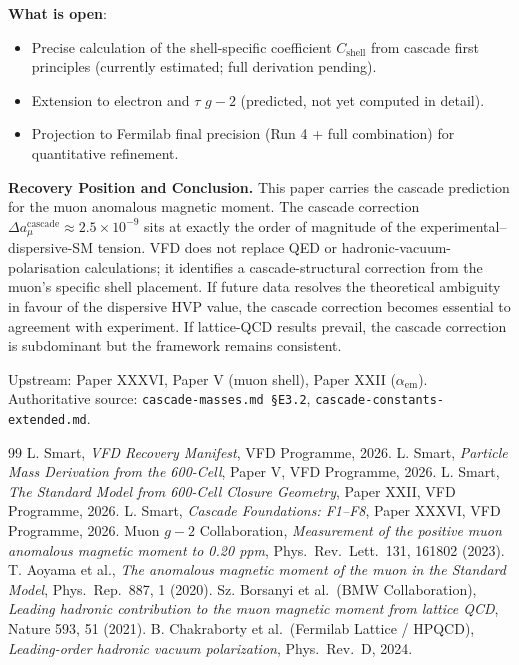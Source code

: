 \documentclass[12pt]{article}
\theoremstyle{remark}
\begin{document}
\textbf{What is open}:
\begin{itemize}
\item Precise calculation of the shell-specific coefficient $C_{\mathrm{shell}}$ from cascade first principles (currently estimated; full derivation pending).
\item Extension to electron and $\tau$ $g-2$ (predicted, not yet computed in detail).
\item Projection to Fermilab final precision (Run 4 + full combination) for quantitative refinement.
\end{itemize}

\textbf{Recovery Position and Conclusion.}
This paper carries the cascade prediction for the muon anomalous magnetic moment. The cascade correction $\Delta a_\mu^{\mathrm{cascade}} \approx 2.5 \times 10^{-9}$ sits at exactly the order of magnitude of the experimental--dispersive-SM tension. VFD does not replace QED or hadronic-vacuum-polarisation calculations; it identifies a cascade-structural correction from the muon's specific shell placement. If future data resolves the theoretical ambiguity in favour of the dispersive HVP value, the cascade correction becomes essential to agreement with experiment. If lattice-QCD results prevail, the cascade correction is subdominant but the framework remains consistent.

Upstream: Paper XXXVI, Paper V (muon shell), Paper XXII ($\alpha_{\mathrm{em}}$). Authoritative source: \texttt{cascade-masses.md §E3.2}, \texttt{cascade-constants-extended.md}.


\begin{thebibliography}{99}
 L. Smart, \emph{VFD Recovery Manifest}, VFD Programme, 2026.
 L. Smart, \emph{Particle Mass Derivation from the 600-Cell}, Paper V, VFD Programme, 2026.
 L. Smart, \emph{The Standard Model from 600-Cell Closure Geometry}, Paper XXII, VFD Programme, 2026.
 L. Smart, \emph{Cascade Foundations: F1--F8}, Paper XXXVI, VFD Programme, 2026.
 Muon $g-2$ Collaboration, \emph{Measurement of the positive muon anomalous magnetic moment to 0.20 ppm}, Phys.\ Rev.\ Lett.\ 131, 161802 (2023).
 T. Aoyama et al., \emph{The anomalous magnetic moment of the muon in the Standard Model}, Phys.\ Rep.\ 887, 1 (2020).
 Sz. Borsanyi et al.\ (BMW Collaboration), \emph{Leading hadronic contribution to the muon magnetic moment from lattice QCD}, Nature 593, 51 (2021).
 B. Chakraborty et al.\ (Fermilab Lattice / HPQCD), \emph{Leading-order hadronic vacuum polarization}, Phys.\ Rev.\ D, 2024.
\end{thebibliography}
\end{document}
